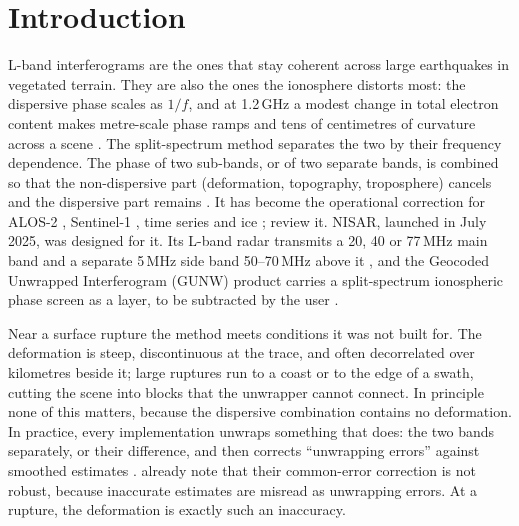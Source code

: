 \section{Introduction}
\label{sec:intro}

L-band interferograms are the ones that stay coherent across large earthquakes in vegetated terrain. They are also the
ones the ionosphere distorts most: the dispersive phase scales as $1/f$, and at 1.2\,GHz a modest change in total
electron content makes metre-scale phase ramps and tens of centimetres of curvature across a scene
\citep{meyer2006potential,meyer2011performance}. The split-spectrum method separates the two by their frequency
dependence. The phase of two sub-bands, or of two separate bands, is combined so that the non-dispersive part
(deformation, topography, troposphere) cancels and the dispersive part remains
\citep{rosen2010measurement,brcic2010estimation,gomba2016toward}. It has become the operational correction for
ALOS-2 \citep{liang2018insar,furuya2017midlatitude,nagaoka2025improved}, Sentinel-1 \citep{gomba2017tops,
liang2019ionospheric}, time series \citep{fattahi2017insar,mao2023reformulating,piromthong2026ionospheric} and ice
\citep{liao2018ionospheric}; \citet{mao2025review} review it. NISAR, launched in July 2025, was designed for it.
Its L-band radar transmits a 20, 40 or 77\,MHz main band and a separate 5\,MHz side band 50--70\,MHz above it
\citep{nisar2018handbook}, and the Geocoded Unwrapped Interferogram (GUNW) product carries a split-spectrum
ionospheric phase screen as a layer, to be subtracted by the user \citep{isce3}.

Near a surface rupture the method meets conditions it was not built for. The deformation is steep, discontinuous at
the trace, and often decorrelated over kilometres beside it; large ruptures run to a coast or to the edge of a swath,
cutting the scene into blocks that the unwrapper cannot connect. In principle none of this matters, because the
dispersive combination contains no deformation. In practice, every implementation unwraps something that does:
the two bands separately, or their difference, and then corrects ``unwrapping errors'' against smoothed estimates
\citep{gomba2016toward,fattahi2017insar,isce3}. \citet[Sec.~III-C]{gomba2016toward} already note that their
common-error correction is not robust, because inaccurate estimates are misread as unwrapping errors. At a rupture,
the deformation is exactly such an inaccuracy.

